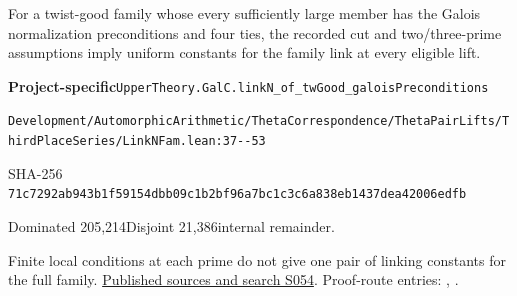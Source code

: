 
\begin{formalstatement}[D427]\label{decomp:D427}
For a twist-good family whose every sufficiently large member has the Galois normalization preconditions and four ties, the recorded cut and two/three-prime assumptions imply uniform constants for the family link at every eligible lift.
\end{formalstatement}
{\small\raggedright\noindent\textsf{\bfseries Project-specific}\quad \nolinkurl{UpperTheory.GalC.linkN_of_twGood_galoisPreconditions}\par\noindent \nolinkurl{Development/AutomorphicArithmetic/ThetaCorrespondence/ThetaPairLifts/ThirdPlaceSeries/LinkNFam.lean:37--53}\par\noindent SHA-256 \nolinkurl{71c7292ab943b1f59154dbb09c1b2bf96a7bc1c3c6a838eb1437dea42006edfb}\par\noindent Dominated 205,214\quad Disjoint 21,386\quad internal remainder.\par}
Finite local conditions at each prime do not give one pair of linking constants for the full family.
\hyperref[lit:S054]{Published sources and search S054}.
Proof-route entries: , .
